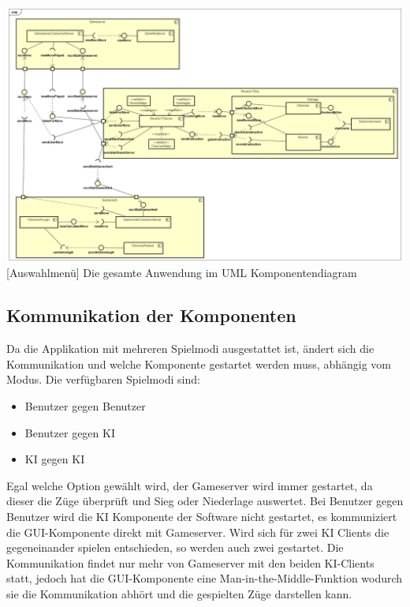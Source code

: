 \documentclass[12pt,a4paper,bibliography=totocnumbered,listof=totocnumbered]{article}
\begin{document}
\vspace{1em}
\begin{minipage}{\linewidth}
	\centering
	\includegraphics[width=1.0\linewidth]{pics/Komponentendiagram.png}
	[Auswahlmenü]{ Die gesamte Anwendung im UML Komponentendiagram}
	\label{fig:ComponentDiagram}
\end{minipage}




\subsection{Kommunikation der Komponenten}
\label{chap:Ablauf}
Da die Applikation mit mehreren Spielmodi ausgestattet ist, ändert sich die Kommunikation und welche Komponente gestartet werden muss, abhängig vom Modus.
Die verfügbaren Spielmodi sind:
\begin{itemize}
    \item Benutzer gegen Benutzer
    \item Benutzer gegen KI
    \item KI gegen KI
\end{itemize}
Egal welche Option gewählt wird, der Gameserver wird immer gestartet, da dieser die Züge überprüft und Sieg oder Niederlage auswertet.
Bei Benutzer gegen Benutzer wird die KI Komponente der Software nicht gestartet, es kommuniziert die GUI-Komponente direkt mit Gameserver.
Wird sich für zwei KI Clients die gegeneinander spielen entschieden, so werden auch zwei gestartet.
Die Kommunikation findet nur mehr von Gameserver mit den beiden KI-Clients statt, jedoch hat die GUI-Komponente eine Man-in-the-Middle-Funktion
wodurch sie die Kommunikation abhört und die gespielten Züge darstellen kann.
\end{document}
